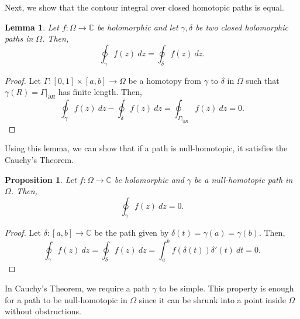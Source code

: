 \documentclass[a4paper, openany]{memoir}
\theoremstyle{definition}
\theoremstyle{plain}
\newtheorem{lemma}[definition]{Lemma}
\newtheorem{proposition}[definition]{Proposition}
\begin{document}
Next, we show that the contour integral over closed homotopic paths is equal.
\begin{lemma}
Let $f: \Omega \to \mathbb{C}$ be holomorphic and let $\gamma, \delta$ be two closed holomorphic paths in $\Omega$. Then,
\[\oint_\gamma f(z) \ dz = \oint_\delta f(z) \ dz.\]
\end{lemma}
\begin{proof}
Let $\Gamma: [0, 1] \times [a, b] \to \Omega$ be a homotopy from $\gamma$ to $\delta$ in $\Omega$ such that $\gamma(R) = \Gamma|_{\partial R}$ has finite length. Then,
\[\oint_\gamma f(z) \ dz - \oint_\delta f(z) \ dz =  \oint_{\Gamma|_{\partial R}} f(z) \ dz = 0.\]
\end{proof}
Using this lemma, we can show that if a path is null-homotopic, it satisfies the Cauchy's Theorem.
\begin{proposition}
Let $f: \Omega \to \mathbb{C}$ be holomorphic and $\gamma$ be a null-homotopic path in $\Omega$. Then,
\[\oint_\gamma f(z) \ dz = 0.\]
\end{proposition}
\begin{proof}
Let $\delta: [a, b] \to \mathbb{C}$ be the path given by $\delta(t) = \gamma(a) = \gamma(b)$. Then,
\[\oint_\gamma f(z) \ dz = \oint_\delta f(z) \ dz = \int_a^b f(\delta(t)) \delta'(t) \ dt = 0.\]
\end{proof}
\noindent In Cauchy's Theorem, we require a path $\gamma$ to be simple. This property is enough for a path to be null-homotopic in $\Omega$ since it can be shrunk into a point inside $\Omega$ without obstructions.
\end{document}
